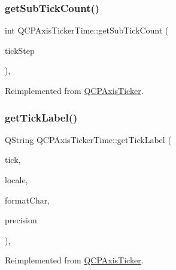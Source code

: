 \mbox{\label{class_q_c_p_axis_ticker_time_acace84c46598176aa53837e147595471}} 
\subsubsection{\texorpdfstring{getSubTickCount()}{getSubTickCount()}}
{\footnotesize\ttfamily int Q\+C\+P\+Axis\+Ticker\+Time\+::get\+Sub\+Tick\+Count (\begin{DoxyParamCaption}\item[{double}]{tick\+Step }\end{DoxyParamCaption})\hspace{0.3cm}{\ttfamily [protected]}, {\ttfamily [virtual]}}



Reimplemented from \mbox{\hyperlink{class_q_c_p_axis_ticker_a4ccc403ced7a1457ce6ba293509933c8}{Q\+C\+P\+Axis\+Ticker}}.

\mbox{\label{class_q_c_p_axis_ticker_time_a046eb771bdf2a959f570db542b3a0be6}} 
\subsubsection{\texorpdfstring{getTickLabel()}{getTickLabel()}}
{\footnotesize\ttfamily Q\+String Q\+C\+P\+Axis\+Ticker\+Time\+::get\+Tick\+Label (\begin{DoxyParamCaption}\item[{double}]{tick,  }\item[{const Q\+Locale \&}]{locale,  }\item[{Q\+Char}]{format\+Char,  }\item[{int}]{precision }\end{DoxyParamCaption})\hspace{0.3cm}{\ttfamily [protected]}, {\ttfamily [virtual]}}



Reimplemented from \mbox{\hyperlink{class_q_c_p_axis_ticker_a8201eb4aa8be192bf786b126eb5ee089}{Q\+C\+P\+Axis\+Ticker}}.

\mbox{\label{class_q_c_p_axis_ticker_time_a5615064642090fe193797caea8b98cb4}} 
